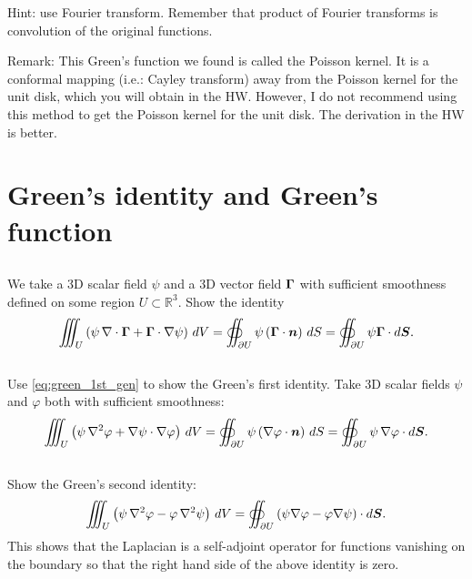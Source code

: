 \documentclass[11pt,letterpaper]{report}
\begin{document}
Hint: use Fourier transform. Remember that product of Fourier transforms is convolution of the original functions. 

Remark: This Green's function we found is called the Poisson kernel. It is a conformal mapping (i.e.: Cayley transform) away from the Poisson kernel for the unit disk, which you will obtain in the HW. However, I do not recommend using this method to get the Poisson kernel for the unit disk. The derivation in the HW is better.

\section{Green's identity and Green's function}
\subsection{}
We take a 3D scalar field $\psi$ and a 3D vector field $\boldsymbol{\Gamma}$ with sufficient smoothness defined on some region $U \subset \mathbb{R}^3$. Show the identity
\begin{align}
    \iiint_U \left( \psi \, \nabla \cdot \boldsymbol{\Gamma} + \boldsymbol{\Gamma} \cdot \nabla \psi\right)\, dV  = \oiint_{\partial U} \psi \left( \boldsymbol{\Gamma} \cdot \boldsymbol{n} \right)\, dS=\oiint_{\partial U}\psi\boldsymbol{\Gamma}\cdot d\boldsymbol{S}.\label{eq:green_1st_gen}
\end{align}

\subsection{}
Use \eqref{eq:green_1st_gen} to show the Green's first identity. Take 3D scalar fields $\psi$ and $\varphi$ both with sufficient smoothness:
\begin{align}
    \iiint_U \left( \psi \, \nabla^2 \varphi + \nabla \psi \cdot \nabla \varphi \right)\, dV  = \oiint_{\partial U} \psi \left( \nabla \varphi \cdot \boldsymbol{n} \right)\, dS=\oiint_{\partial U}\psi\,\nabla\varphi\cdot d\boldsymbol{S}.
\end{align}

\subsection{}
Show the Green's second identity:
\begin{align}
    \iiint_U \left( \psi \, \nabla^2 \varphi - \varphi \, \nabla^2 \psi\right)\, dV = \oiint_{\partial U} \left( \psi \nabla \varphi - \varphi \nabla \psi\right)\cdot d\boldsymbol{S}.
\end{align}
This shows that the Laplacian is a self-adjoint operator for functions vanishing on the boundary so that the right hand side of the above identity is zero.
\end{document}
